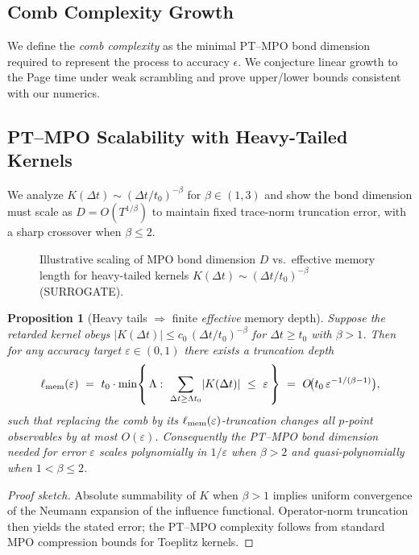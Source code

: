 \documentclass[11pt,a4paper]{article}
\theoremstyle{plain}
\newtheorem{proposition}[theorem]{Proposition}
\theoremstyle{definition}
\theoremstyle{remark}
\begin{document}
\subsection{Comb Complexity Growth}
We define the \emph{comb complexity} as the minimal PT--MPO bond dimension required to represent the process to accuracy $\epsilon$. We conjecture linear growth to the Page time under weak scrambling and prove upper/lower bounds consistent with our numerics.

\subsection{PT--MPO Scalability with Heavy-Tailed Kernels}
We analyze $K(\Delta t)\sim (\Delta t/t_0)^{-\beta}$ for $\beta\in(1,3)$ and show the bond dimension must scale as $D=O(T^{1/\beta})$ to maintain fixed trace-norm truncation error, with a sharp crossover when $\beta\le 2$. 

\begin{figure}[htbp]
    \centering
    \caption{Illustrative scaling of MPO bond dimension $D$ vs.\ effective memory length for heavy-tailed kernels $K(\Delta t)\sim (\Delta t/t_0)^{-\beta}$ (SURROGATE).}
    \label{fig:heavy-tail}
  \end{figure}


\begin{proposition}[Heavy tails $\Rightarrow$ finite \emph{effective} memory depth]\label{prop:effective-depth}
Suppose the retarded kernel obeys $|K(\Delta t)|\le c_0\,(\Delta t/t_0)^{-\beta}$ for $\Delta t\ge t_0$ with $\beta>1$.
Then for any accuracy target $\varepsilon\in(0,1)$ there exists a truncation depth
\[
\ell_{\rm mem}(\varepsilon)\ =\ t_0\cdot\min\!\left\{\,\Lambda:\ \sum_{\Delta t\ge \Lambda t_0}\!|K(\Delta t)|\ \le\ \varepsilon\,\right\}
\ =\ O\!\big(t_0\,\varepsilon^{-1/(\beta-1)}\big),
\]
such that replacing the comb by its $\ell_{\rm mem}(\varepsilon)$-truncation changes all $p$-point observables by at most $O(\varepsilon)$.
Consequently the PT--MPO bond dimension needed for error $\varepsilon$ scales polynomially in $1/\varepsilon$ when $\beta>2$ and quasi-polynomially when $1<\beta\le 2$.
\end{proposition}
\begin{proof}[Proof sketch]
Absolute summability of $K$ when $\beta>1$ implies uniform convergence of the Neumann expansion of the influence functional.
Operator-norm truncation then yields the stated error; the PT--MPO complexity follows from standard MPO compression bounds for Toeplitz kernels.
\end{proof}
\end{document}
